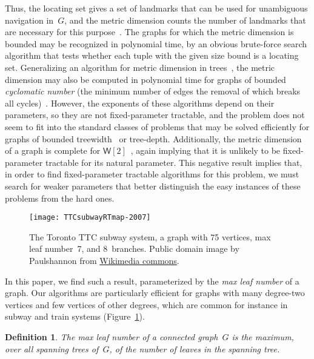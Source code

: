 \documentclass{jgaa-art}
\newtheorem{definition}{Definition}
\begin{document}
Thus, the locating set gives a set of landmarks that can be used for unambiguous navigation in~$G$, and the metric dimension counts the number of landmarks that are necessary for this purpose~\cite{KhuRagRos-DAM-96}.
The graphs for which the metric dimension is bounded may be recognized in polynomial time, by an obvious brute-force search algorithm that tests whether each tuple with the given size bound is a locating set. Generalizing an algorithm for metric dimension in trees~\cite{HarMel-AC-76}, the metric dimension may also be computed in polynomial time for graphs of bounded \emph{cyclomatic number} (the minimum number of edges the removal of which breaks all cycles)~\cite{EpsLevWoe-WG-12}. However, the exponents of these algorithms depend on their parameters, so they are not fixed-parameter tractable, and the problem does not seem to fit into the standard classes of problems that may be solved efficiently for graphs of bounded treewidth~\cite{DiaPotSer-ESA-12} or tree-depth. Additionally, the metric dimension of a graph is complete for $\mathsf{W}[2]$~\cite{HarNic-CCC-13}, again implying that it is unlikely to be fixed-parameter tractable for its natural parameter. This negative result implies that, in order to find fixed-parameter tractable algorithms for this problem, we must search for weaker parameters that better distinguish the easy instances of these problems from the hard ones.

\begin{figure}[t]
\centering\texttt{[image: TTCsubwayRTmap-2007]}
\caption{The Toronto TTC subway system, a graph with 75 vertices, max leaf number~7, and 8~branches. Public domain image by Paulshannon from \href{http://commons.wikimedia.org/wiki/File:TTCsubwayRTmap-2007.svg}{Wikimedia commons}.}
\label{fig:TTC}
\end{figure}

In this paper, we find such a result, parameterized by the \emph{max leaf number} of a graph.  Our algorithms are particularly efficient for graphs with many degree-two vertices and few vertices of other degrees, which are common for instance in subway and train systems (Figure~\ref{fig:TTC}).

\begin{definition}
The \emph{max leaf number} of a connected graph~$G$ is the maximum, over all spanning trees of~$G$, of the number of leaves in the spanning tree.
\end{definition}
\end{document}
